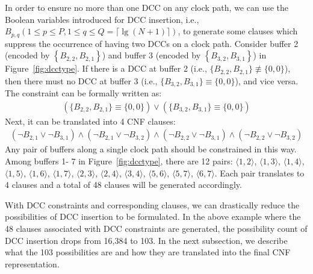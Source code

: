 In order to ensure no more than one DCC on any clock path, we can use the Boolean variables introduced for DCC insertion, i.e., {\fontsize{9}{10}$B_{p,q} \left(1 \leq p \leq P, 1 \leq q \leq Q = \lceil \lg (N + 1) \rceil \right)$}, to generate some clauses which suppress the occurrence of having two DCCs on a clock path. Consider buffer 2 (encoded by {\fontsize{9}{10}$\left\{B_{2,2}, B_{2,1}\right\}$}) and buffer 3 (encoded by {\fontsize{9}{10}$\left\{B_{3,2}, B_{3,1}\right\}$}) in Figure~\ref{fig:dcctype}. If there is a DCC at buffer 2 (i.e., {\fontsize{9}{10}$\{B_{2,2}, B_{2,1}\} \not\equiv \{0, 0\}$}), then there must no DCC at buffer 3 (i.e., {\fontsize{9}{10}$\{B_{3,2}, B_{3,1}\} \equiv \{0, 0\}$}), and vice versa. The constraint can be formally written as:
{\fontsize{9}{10}
\begin{gather*}
\left(\{B_{2,2}, B_{2,1}\} \equiv \{0, 0\}\right) \lor \left(\{B_{3,2}, B_{3,1}\} \equiv \{0, 0\}\right)
\end{gather*}}
Next, it can be translated into 4 CNF clauses:
{\fontsize{9}{10}
\begin{equation*}
\begin{split}
(\neg B_{2,1}\lor\neg B_{3,1}) \land (\neg B_{2,1}\lor\neg B_{3,2}) \land (\neg B_{2,2}\lor\neg B_{3,1}) \land (\neg B_{2,2}\lor\neg B_{3,2})
\end{split}
\end{equation*}}
Any pair of buffers along a single clock path should be constrained in this way. Among buffers 1- 7 in Figure~\ref{fig:dcctype}, there are 12 pairs: $\langle1, 2\rangle$, $\langle1, 3\rangle$, $\langle1, 4\rangle$, $\langle1, 5\rangle$, $\langle1, 6\rangle$, $\langle1, 7\rangle$, $\langle2, 3\rangle$, $\langle2, 4\rangle$, $\langle3, 4\rangle$, $\langle5, 6\rangle$, $\langle5, 7\rangle$, $\langle6, 7\rangle$. Each pair translates to 4 clauses and a total of 48 clauses will be generated accordingly.

With DCC constraints and corresponding clauses, we can drastically reduce the possibilities of DCC insertion to be formulated. In the above example where the 48 clauses associated with DCC constraints are generated, the possibility count of DCC insertion drops from 16,384 to 103. In the next subsection, we describe what the 103 possibilities are and how they are translated into the final CNF representation.

